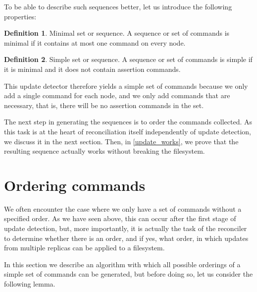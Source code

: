 \documentclass[12pt]{article}
\theoremstyle{definition}
\newtheorem{mydef}{Definition}
\begin{document}
To be able to describe such sequences better, let us introduce the following properties:

\begin{mydef}{Minimal set or sequence.}
A sequence or set of commands is minimal if it contains at most one command on every node.
\end{mydef}

\begin{mydef}{Simple set or sequence.}
A sequence or set of commands is simple if it is minimal and it does not contain assertion commands.
\end{mydef}

This update detector therefore yields a simple set of commands because we only add a single command
for each node, and we only add commands that are necessary, that is, there will be no 
assertion commands in the set.

The next step in generating the sequences is to order the commands collected.
As this task is at the heart of reconciliation itself independently of update detection,
we discuss it in the next section.
Then, in \cref{update_works}, we prove that the resulting sequence actually
works without breaking the filesystem.



\section{Ordering commands}\label{ordering}

We often encounter the case where we only have a set of commands without a specified order.
As we have seen above, this can occur after the first stage of update detection,
but, more importantly,
it is actually the task of the reconciler to determine whether there is an order,
and if yes, what order,
in which updates from multiple replicas can be applied to a filesystem.

In this section we describe an algorithm with which all possible orderings of a
simple set of commands can be generated, but before doing so, let us consider the following lemma.
\end{document}
